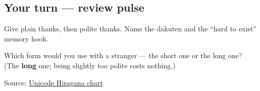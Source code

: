 \subsection*{Your turn — review pulse}
Give plain thanks, then polite thanks. Name the dakuten and the “hard to exist” memory hook.

\begin{tcolorbox}[breakable,colback=teal!4,colframe=teal!35!black,title={Before you move on}]
Which form would you use with a stranger — the short one or the long one? (The \textbf{long} one; being slightly too polite costs nothing.)

Source: \href{https://www.unicode.org/charts/PDF/U3040.pdf}{Unicode Hiragana chart}
\end{tcolorbox}
